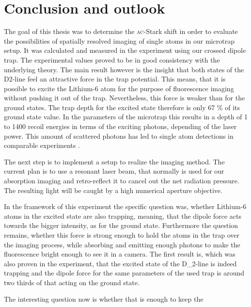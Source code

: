 \chapter{Conclusion and outlook}

The goal of this thesis was to determine the \textsc{ac}-Stark shift in order to evaluate the possibilities of spatially resolved imaging of single atoms in our microtrap setup. It was calculated and measured in the experiment using our crossed dipole trap. The experimental values proved to be in good consistency with the underlying theory. The main result however is the insight that both states of the D2-line feel an attractive force in the trap potential. This means, that it is possible to excite the Lithium-6 atom for the purpose of fluorescence imaging without pushing it out of the trap. Nevertheless, this force is weaker than for the ground states. The trap depth for the excited state therefore is only 67 \% of its ground state value. In the parameters of the microtrap this results in a depth of 1 to 1400 recoil energies in terms of the exciting photons, depending of the laser power. This amount of scattered photons has led to single atom detections in comparable experiments \cite{schmiedmayer}.

The next step is to implement a setup to realize the imaging method. The current plan is to use a resonant laser beam, that normally is used for our absorption imaging and retro-reflect it to cancel out the net radiation pressure. The resulting light will be caught by a high numerical aperture objective. 


In the framework of this experiment the specific question was, whether Lithium-6 atoms in the excited state are also trapping, meaning, that the dipole force acts towards the bigger intensity, as for the ground state. Furthermore the question remains, whether this force is strong enough to hold the atoms in the trap over the imaging process, while absorbing and emitting enough photons to make the fluorescence bright enough to see it in a camera. The first result is, which was also proven in the experiment, that the excited state of the D_2-line is indeed trapping and the dipole force for the same parameters of the used trap is around two thirds of that acting on the ground state.

The interesting question now is whether that is enough to keep the 